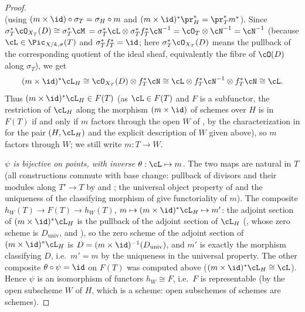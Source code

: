 \begin{proof}
\[\]
(using $(m\times\id)\circ\sigma_T=\sigma_H\circ m$ and
$(m\times\id)^*\pr_H^*=\pr_T^*m^*$).  Since $\sigma_T^*\cO_{X_T}(D)\cong\sigma_T^*\cM$
$=\sigma_T^*\cL\otimes\sigma_T^*f_T^*\cN^{-1} =\cO_T\otimes\cN^{-1}
=\cN^{-1}$ (because $\cL\in\Pic_{X/k,\sigma}(T)$ and
$\sigma_T^*f_T^*=\id$; here $\sigma_T^*\cO_{X_T}(D)$ means the pullback of
the corresponding quotient of the ideal sheaf, equivalently the fibre of
$\cO(D)$ along $\sigma_T$), we get
\[
(m\times\id)^*\cL_H\cong\cO_{X_T}(D)\otimes f_T^*\cN
\cong\cL\otimes f_T^*\cN^{-1}\otimes f_T^*\cN\cong\cL.
\]
Thus $(m\times\id)^*\cL_H\in F(T)$ (as $\cL\in F(T)$ and $F$ is a
subfunctor, the restriction of $\cL_H$ along the morphism $(m\times\id)$
of schemes over $H$ is in $F(T)$ if and only if $m$ factors through the
open $W$ of , by the characterization in
 for the pair $(H,\cL_H)$ and the explicit
description of $W$ given above), so $m$ factors through $W$; we still
write $m:T\to W$.

\emph{$\psi$ is bijective on points, with inverse
$\theta:\cL\mapsto m$.}  The two maps are natural in $T$ (all constructions
commute with base change: pullback of divisors and their modules along
$T'\to T$ by  and ;
the universal object property of  and the
uniqueness of the classifying morphism of 
give functoriality of $m$).  The composite
$h_W(T)\to F(T)\to h_W(T)$, $m\mapsto(m\times\id)^*\cL_H\mapsto m'$: the
adjoint section of $(m\times\id)^*\cL_H$ is the pullback of the adjoint
section of $\cL_H$ (, whose zero
scheme is $D_{\mathrm{univ}}$, and ), so the
zero scheme of the adjoint section of
$(m\times\id)^*\cL_H$ is $D=(m\times\id)^{-1}(D_{\mathrm{univ}})$, and
$m'$ is exactly the morphism classifying $D$, i.e.\ $m'=m$ by the
uniqueness in the universal property.  The other composite
$\theta\circ\psi=\id$ on $F(T)$ was computed above
($(m\times\id)^*\cL_H\cong\cL$).  Hence $\psi$ is an isomorphism of
functors $h_W\cong F$, i.e.\ $F$ is representable (by the open subscheme
$W$ of $H$, which is a scheme: open subschemes of schemes are schemes).
\end{proof}

